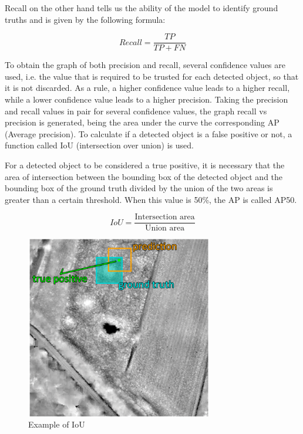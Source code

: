 Recall on the other hand tells us the ability of the model to identify ground truths and is given by the following formula:

\begin{equation}
     Recall = \frac{TP }{TP + FN}
\end{equation}

To obtain the graph of both precision and recall, several confidence values are used, i.e. the value that is required to be trusted for each detected object, so that it is not discarded. As a rule, a higher confidence value leads to a higher recall, while a lower confidence value leads to a higher precision. Taking the precision and recall values in pair for several confidence values, the graph recall vs precision is generated, being the area under the curve the corresponding AP (Average precision). To calculate if a detected object is a false positive or not, a function called IoU (intersection over union) is used.

For a detected object to be considered a true positive, it is necessary that the area of intersection between the bounding box of the detected object and the bounding box of the ground truth divided by the union of the two areas is greater than a certain threshold. When this value is 50\%, the AP is called AP50.

\begin{equation}
     IoU = \frac{\text{Intersection area}}{\text{Union area}}
\end{equation}

\begin{figure}[H]
\centering
\includegraphics[height=8cm]{images/IOU.png}
\caption{Example of IoU \cite{Deep Learning for Archaeological Object Detection on LiDAR:
New Evaluation Measures and Insights}}
\end{figure}

